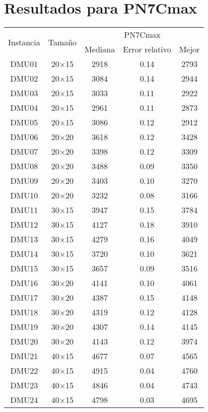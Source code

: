 \section{Resultados para PN7Cmax}

\begin{table}[H]
\centering
\begin{tabular}{@{}ccccc@{}}
\toprule
\multirow{2}{*}{Instancia} & \multirow{2}{*}{Tamaño} & \multicolumn{3}{c}{ PN7Cmax} \\ \cmidrule(lr){3-5}
& & Mediana& Error relativo & Mejor  \\ \midrule
DMU01 & 20$\times$15 & 2918 & 0.14 & 2793\\ 
DMU02 & 20$\times$15 & 3084 & 0.14 & 2944\\ 
DMU03 & 20$\times$15 & 3033 & 0.11 & 2922\\ 
DMU04 & 20$\times$15 & 2961 & 0.11 & 2873\\ 
DMU05 & 20$\times$15 & 3086 & 0.12 & 2912\\ 
DMU06 & 20$\times$20 & 3618 & 0.12 & 3428\\ 
DMU07 & 20$\times$20 & 3398 & 0.12 & 3309\\ 
DMU08 & 20$\times$20 & 3488 & 0.09 & 3350\\ 
DMU09 & 20$\times$20 & 3403 & 0.10 & 3270\\ 
DMU10 & 20$\times$20 & 3232 & 0.08 & 3166\\ 
DMU11 & 30$\times$15 & 3947 & 0.15 & 3784\\ 
DMU12 & 30$\times$15 & 4127 & 0.18 & 3910\\ 
DMU13 & 30$\times$15 & 4279 & 0.16 & 4049\\ 
DMU14 & 30$\times$15 & 3720 & 0.10 & 3621\\ 
DMU15 & 30$\times$15 & 3657 & 0.09 & 3516\\ 
DMU16 & 30$\times$20 & 4141 & 0.10 & 4061\\ 
DMU17 & 30$\times$20 & 4387 & 0.15 & 4148\\ 
DMU18 & 30$\times$20 & 4319 & 0.12 & 4128\\ 
DMU19 & 30$\times$20 & 4307 & 0.14 & 4145\\ 
DMU20 & 30$\times$20 & 4143 & 0.12 & 3974\\ 
DMU21 & 40$\times$15 & 4677 & 0.07 & 4565\\ 
DMU22 & 40$\times$15 & 4915 & 0.04 & 4760\\ 
DMU23 & 40$\times$15 & 4846 & 0.04 & 4743\\ 
DMU24 & 40$\times$15 & 4798 & 0.03 & 4695\\ 

\end{tabular}
\end{table}
